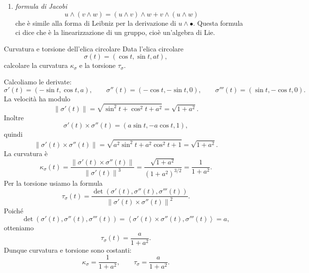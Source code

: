 \documentclass[a4paper]{article}
\begin{document}
\begin{snippetproposition}{}
\begin{enumerate}
\begin{align*}
        \end{align*}
        cioè \[
            u \cdot (v \wedge w) = v \cdot (w \wedge u) = w \cdot (u \wedge v)
        \]
        \item \emph{formula di Jacobi}
        \[
            u \wedge (v \wedge w) = (u \wedge v) \wedge w + v \wedge (u \wedge w)
        \]
        che è simile alla forma di Leibniz per la derivazione di \(u \wedge \bullet\).
        Questa formula ci dice che è la linearizzazione di un gruppo, cioè un'algebra di Lie.
    \end{enumerate}
\end{snippetproposition}



\begin{snippetexercise}{Curvatura e torsione dell'elica circolare}
    Data l'elica circolare
    \[
        \sigma(t)=(\cos t,\sin t,at),
    \]
    calcolare la curvatura \(\kappa_\sigma\) e la torsione \(\tau_\sigma\).
\end{snippetexercise}

\begin{snippetsolution}{}
    Calcoliamo le derivate:
    \[
        \sigma'(t)=(-\sin t,\cos t,a),
        \qquad
        \sigma''(t)=(-\cos t,-\sin t,0),
        \qquad
        \sigma'''(t)=(\sin t,-\cos t,0).
    \]
    La velocità ha modulo
    \[
        \left\|\sigma'(t)\right\|
        =
        \sqrt{\sin^2t+\cos^2t+a^2}
        =
        \sqrt{1+a^2}.
    \]
    Inoltre
    \[
        \sigma'(t)\times\sigma''(t)
        =
        \left(
            a\sin t,
            -a\cos t,
            1
        \right),
    \]
    quindi
    \[
        \left\|\sigma'(t)\times\sigma''(t)\right\|
        =
        \sqrt{a^2\sin^2t+a^2\cos^2t+1}
        =
        \sqrt{1+a^2}.
    \]
    La curvatura è
    \[
        \kappa_\sigma(t)
        =
        \frac{\left\|\sigma'(t)\times\sigma''(t)\right\|}{\left\|\sigma'(t)\right\|^3}
        =
        \frac{\sqrt{1+a^2}}{(1+a^2)^{3/2}}
        =
        \frac{1}{1+a^2}.
    \]
    Per la torsione usiamo la formula
    \[
        \tau_\sigma(t)
        =
        \frac{\det(\sigma'(t),\sigma''(t),\sigma'''(t))}{\left\|\sigma'(t)\times\sigma''(t)\right\|^2}.
    \]
    Poiché
    \[
        \det(\sigma'(t),\sigma''(t),\sigma'''(t))
        =
        \left\langle
            \sigma'(t)\times\sigma''(t),
            \sigma'''(t)
        \right\rangle
        =
        a,
    \]
    otteniamo
    \[
        \tau_\sigma(t)
        =
        \frac{a}{1+a^2}.
    \]
    Dunque curvatura e torsione sono costanti:
    \[
        \kappa_\sigma=\frac{1}{1+a^2},
        \qquad
        \tau_\sigma=\frac{a}{1+a^2}.
    \]
\end{snippetsolution}
\end{document}
